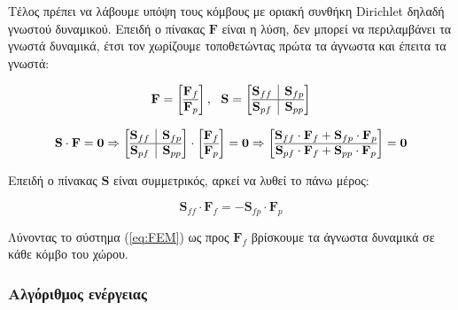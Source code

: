 \documentclass[10pt, letterpaper]{article}
\newcommand{\en}{\selectlanguage{english}}
\newcommand{\gr}{\selectlanguage{greek}}
\begin{document}
Τέλος πρέπει να λάβουμε υπόψη τους κόμβους με οριακή συνθήκη \en Dirichlet \gr δηλαδή γνωστού δυναμικού. Επειδή ο πίνακας $\mathbf{F}$ είναι η λύση,
δεν μπορεί να περιλαμβάνει τα γνωστά δυναμικά, έτσι τον χωρίζουμε τοποθετώντας πρώτα τα άγνωστα και έπειτα τα γνωστά:

\[
\mathbf{F} = 
\left[ \begin{array}{@{}c@{}}
\mathbf{F}_f \\
\hline
\mathbf{F}_p
\end{array} \right]
, \ \
\mathbf{S} = 
\left[ \begin{array}{@{}c|c@{}}
  \mathbf{S}_{ff} & \mathbf{S}_{fp} \\
  \hline
  \mathbf{S}_{pf} & \mathbf{S}_{pp}
  \end{array} \right]
\]

\[
  \mathbf{S} \cdot \mathbf{F} = \mathbf{0} \Rightarrow 
  \left[ \begin{array}{@{}c|c@{}}
    \mathbf{S}_{ff} & \mathbf{S}_{fp} \\
    \hline
    \mathbf{S}_{pf} & \mathbf{S}_{pp}
    \end{array} \right] \cdot
    \left[ \begin{array}{@{}c@{}}
      \mathbf{F}_f \\
      \hline
      \mathbf{F}_p
      \end{array} \right] = \mathbf{0} \Rightarrow
      \left[ \begin{array}{@{}c@{}}
        \mathbf{S}_{ff} \cdot \mathbf{F}_f + \mathbf{S}_{fp} \cdot \mathbf{F}_p \\
        \hline
        \mathbf{S}_{pf} \cdot \mathbf{F}_f + \mathbf{S}_{pp} \cdot \mathbf{F}_p
        \end{array} \right] = \mathbf{0}
\]

Επειδή ο πίνακας $\mathbf{S}$ είναι συμμετρικός, αρκεί να λυθεί το πάνω μέρος:

\begin{equation}   \label{eq:FEM}
  \mathbf{S}_{ff} \cdot \mathbf{F}_f = - \mathbf{S}_{fp} \cdot \mathbf{F}_p
\end{equation}

Λύνοντας το σύστημα (\ref{eq:FEM}) ως προς $\mathbf{F}_f$ βρίσκουμε τα άγνωστα δυναμικά σε κάθε κόμβο του χώρου.




\subsubsection*{Αλγόριθμος ενέργειας}
\end{document}
